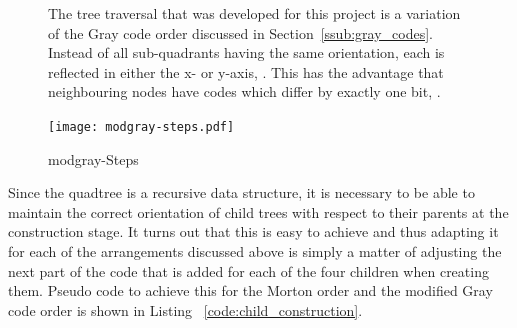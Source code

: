 \begin{figure}[tbhp]
\begin{subfigure}[c]{0.55\linewidth}
        \caption{}\label{fig:modgray-2-levels-numbers.pdf}
    \end{subfigure}
    \caption{The tree traversal that was developed for this project is a
    	variation of the Gray code order discussed in
    	Section~\ref{ssub:gray_codes}.  Instead of all sub-quadrants having the
    	same orientation, each is reflected in either the x- or y-axis,
    	. This has the advantage that
		neighbouring nodes have codes which differ by exactly one bit,
		.} \label{fig:modgray-traversal}
\end{figure}

\begin{figure}[tbhp]
	\centering
	\texttt{[image: modgray-steps.pdf]}
	\caption{modgray-Steps}
	\label{fig:modgray-steps}
\end{figure}

Since the quadtree is a recursive data structure, it is necessary to be able
to maintain the correct orientation of child trees with respect to their
parents at the construction stage. It turns out that this is easy to achieve
and thus adapting it for each of the arrangements discussed above is simply a
matter of adjusting the next part of the code that is added for each of the
four children when creating them. Pseudo code to achieve this for the Morton
order and the modified Gray code order is shown in Listing
~\ref{code:child_construction}.

